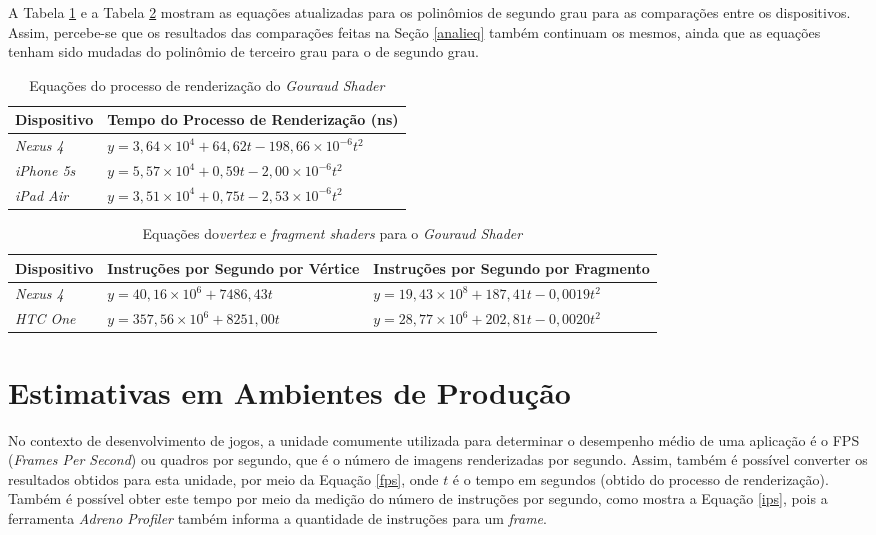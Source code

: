 	A Tabela \ref{render_time_compsec} e a Tabela \ref{vertex_frag_compsec} mostram as equações atualizadas para os polinômios de segundo grau para as comparações entre os dispositivos. Assim, percebe-se que os resultados das comparações feitas na Seção \ref{analieq} também continuam os mesmos, ainda que as equações tenham sido mudadas do polinômio de terceiro grau para o de segundo grau. 

	
	\begin{table}[ht]
	\centering	
	\begin{tabularx}{0.9\textwidth}{lX}
		\toprule
		\textbf{Dispositivo} & \textbf{Tempo do Processo de Renderização (ns)}  \\
		\midrule
		\textit{Nexus 4} &  $y = 3,64 \times 10^4 + 64,62t - 198,66 \times 10^{-6}t^2$\\
		\textit{iPhone 5s} &   $y = 5,57 \times 10^4 + 0,59t - 2,00 \times 10^{-6}t^2$\\
		\textit{iPad Air} & $y = 3,51 \times 10^4 + 0,75t - 2,53 \times 10^{-6}t^2$\\	
		\bottomrule
	\end{tabularx}
	\caption{Equações do processo de renderização do \textit{Gouraud Shader}}
	\label{render_time_compsec}
	\end{table}

	\begin{table}[ht]
	\centering	
	\begin{tabularx}{0.9\textwidth}{lXX}
		\toprule
		\textbf{Dispositivo} & \textbf{Instruções por Segundo por Vértice} & \textbf{Instruções por Segundo por Fragmento}  \\
		\midrule
		\textit{Nexus 4} & $y = 40,16 \times 10^6 + 7486,43t$ &$y = 19,43 \times 10 ^8 + 187,41t - 0,0019t^2$  \\
		\textit{HTC One} & $y = 357,56 \times 10^6 + 8251,00t$ & $y = 28,77 \times 10 ^6+ 202,81t - 0,0020t^2$  \\

		\bottomrule
	\end{tabularx}
	\caption{Equações do\textit{vertex} e \textit{fragment shaders} para o \textit{Gouraud Shader}}
	\label{vertex_frag_compsec}
	\end{table}

\section{Estimativas em Ambientes de Produção}

	No contexto de desenvolvimento de jogos, a unidade comumente utilizada para determinar o desempenho médio de uma aplicação é o FPS (\textit{Frames Per Second}) ou quadros por segundo, que é o número de imagens renderizadas por segundo. Assim, também é possível converter os resultados obtidos para esta unidade, por meio da Equação \ref{fps}, onde $t$ é o tempo em segundos (obtido do processo de renderização). Também é possível obter este tempo por meio da medição do número de instruções por segundo,  como mostra a Equação \ref{ips}, pois a ferramenta \textit{Adreno Profiler} também informa a quantidade de instruções para um \textit{frame}.

